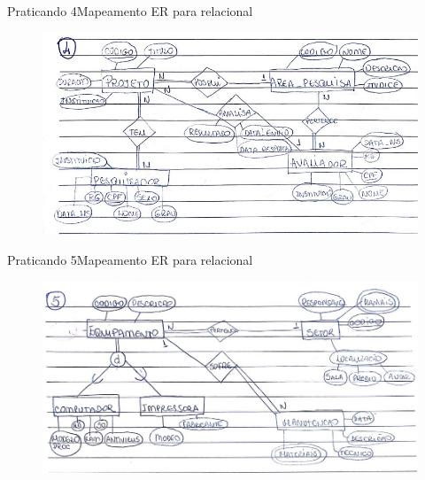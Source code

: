 \documentclass[t]{beamer}
\begin{document}
\begin{ftst}{Praticando 4}{Mapeamento ER para relacional}

\begin{figure}
    \centering
    \includegraphics[scale=0.6]{Praticando_figuras/4.jpg}
\end{figure}
\end{ftst}


\begin{ftst}{Praticando 5}{Mapeamento ER para relacional}

\begin{figure}
    \centering
    \includegraphics[scale=0.5]{Praticando_figuras/5.jpg}
\end{figure}
\end{ftst}

\end{document}
